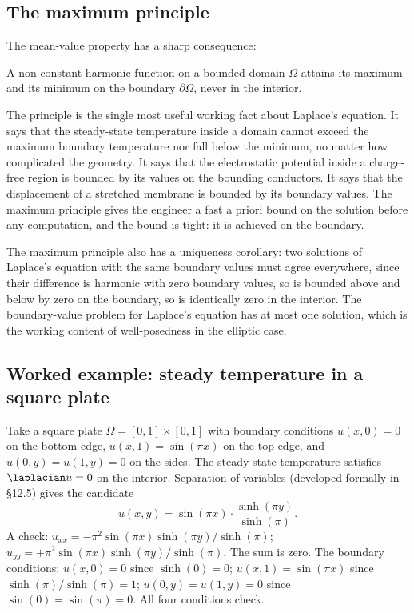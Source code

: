 \subsection{The maximum principle}

The mean-value property has a sharp consequence:

\begin{principle}
A non-constant harmonic function on a bounded domain $\Omega$
attains its maximum and its minimum on the boundary $\partial
\Omega$, never in the interior.
\end{principle}

The principle is the single most useful working fact about
Laplace's equation. It says that the steady-state temperature
inside a domain cannot exceed the maximum boundary temperature
nor fall below the minimum, no matter how complicated the
geometry. It says that the electrostatic potential inside a
charge-free region is bounded by its values on the bounding
conductors. It says that the displacement of a stretched membrane
is bounded by its boundary values. The maximum principle gives
the engineer a fast a priori bound on the solution before any
computation, and the bound is tight: it is achieved on the
boundary.

The maximum principle also has a uniqueness corollary: two
solutions of Laplace's equation with the same boundary values
must agree everywhere, since their difference is harmonic with
zero boundary values, so is bounded above and below by zero on the
boundary, so is identically zero in the interior. The
boundary-value problem for Laplace's equation has at most one
solution, which is the working content of well-posedness in the
elliptic case.

\subsection{Worked example: steady temperature in a square plate}

Take a square plate $\Omega = [0, 1] \times [0, 1]$ with
boundary conditions $u(x, 0) = 0$ on the bottom edge, $u(x, 1) =
\sin(\pi x)$ on the top edge, and $u(0, y) = u(1, y) = 0$ on the
sides. The steady-state temperature satisfies $\laplacian u = 0$
on the interior. Separation of variables (developed formally in
§12.5) gives the candidate
\[
u(x, y) = \sin(\pi x) \cdot \frac{\sinh(\pi y)}{\sinh(\pi)}.
\]
A check: $u_{xx} = -\pi^{2} \sin(\pi x) \sinh(\pi y)/\sinh(\pi)$;
$u_{yy} = +\pi^{2} \sin(\pi x) \sinh(\pi y)/\sinh(\pi)$. The sum is
zero. The boundary conditions: $u(x, 0) = 0$ since $\sinh(0) =
0$; $u(x, 1) = \sin(\pi x)$ since $\sinh(\pi)/\sinh(\pi) = 1$;
$u(0, y) = u(1, y) = 0$ since $\sin(0) = \sin(\pi) = 0$. All four
conditions check.

